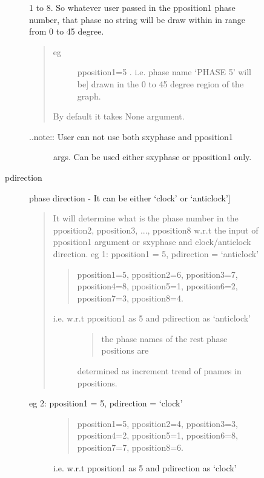 \documentclass[letterpaper,10pt,english]{sphinxmanual}
\begin{document}
\begin{fulllineitems}
\begin{description}
\begin{description}
\begin{description}
1 to 8. So whatever user passed in the pposition1 phase
number, that phase no string will be draw within in range
from 0 to 45 degree.
\begin{quote}
\begin{description}
\item[{eg}] \leavevmode{[}pposition1=5 . i.e. phase name `PHASE 5' will be{]}
drawn in the 0 to 45 degree region of the graph.

\end{description}

By default it takes None argument.
\end{quote}
\begin{description}
\item[{..note:: User can not use both sxyphase and pposition1}] \leavevmode
args. Can be used either sxyphase or pposition1
only.

\end{description}

\item[{pdirection}] \leavevmode{[}phase direction - It can be either `clock' or `anticlock'{]}\begin{quote}

It will determine what is the phase number in the
pposition2, pposition3, ..., pposition8 w.r.t the input
of pposition1 argument or sxyphase and clock/anticlock
direction.
eg 1: pposition1 = 5, pdirection = `anticlock'
\begin{quote}

pposition1=5, pposition2=6, pposition3=7, pposition4=8,
pposition5=1, pposition6=2, pposition7=3, pposition8=4.
\end{quote}
\begin{description}
\item[{i.e. w.r.t pposition1 as 5 and pdirection as `anticlock'}] \leavevmode\begin{quote}

the phase names of the rest phase positions are
\end{quote}

determined as increment trend of pnames in ppositions.

\end{description}
\end{quote}
\begin{description}
\item[{eg 2: pposition1 = 5, pdirection = `clock'}] \leavevmode\begin{quote}

pposition1=5, pposition2=4, pposition3=3, pposition4=2,
pposition5=1, pposition6=8, pposition7=7, pposition8=6.
\end{quote}
\begin{description}
\item[{i.e. w.r.t pposition1 as 5 and pdirection as `clock'}] \leavevmode\begin{quote}


\end{quote}
\end{description}
\end{description}
\end{description}
\end{description}
\end{description}
\end{fulllineitems}
\end{document}
